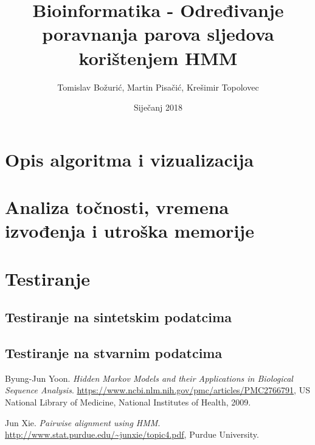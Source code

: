 \documentclass[a4paper]{article}
\begin{document}
\title{Bioinformatika - Određivanje poravnanja parova sljedova korištenjem HMM}
\author{Tomislav Božurić, Martin Pisačić, Krešimir Topolovec}
\date{Siječanj 2018}
\maketitle


\section{Opis algoritma i vizualizacija}

\section{Analiza točnosti, vremena izvođenja i utroška memorije}

\section{Testiranje}
\subsection{Testiranje na sintetskim podatcima}
\subsection{Testiranje na stvarnim podatcima}

\newpage
\begin{thebibliography}{9}
Byung-Jun Yoon. 
\textit{Hidden Markov Models and their Applications in Biological Sequence Analysis}.
\url{https://www.ncbi.nlm.nih.gov/pmc/articles/PMC2766791}, 
 US National Library of Medicine, National Institutes of Health, 2009.


Jun Xie. 
\textit{Pairwise alignment using HMM}.
\url{http://www.stat.purdue.edu/~junxie/topic4.pdf},
 Purdue University.


\end{thebibliography}
\end{document}
